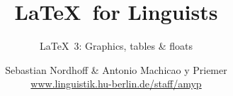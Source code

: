 


\title{
	\LaTeX\ for Linguists
}

\subtitle{\LaTeX\ 3: Graphics, tables \& floats}

\author[aMyP]{
	{\small Sebastian Nordhoff \& Antonio Machicao y Priemer}
	\\
	{\footnotesize \url{www.linguistik.hu-berlin.de/staff/amyp}}
}








\begin{frame}
  \HUtitle
\end{frame}





\nocite{Freitag&MyP15a}
\nocite{Knuth1986}
\nocite{Kopka94a}
\nocite{MyP17c}
\nocite{MyP&Kerkhof16a}
	


%
%
%
%
%


